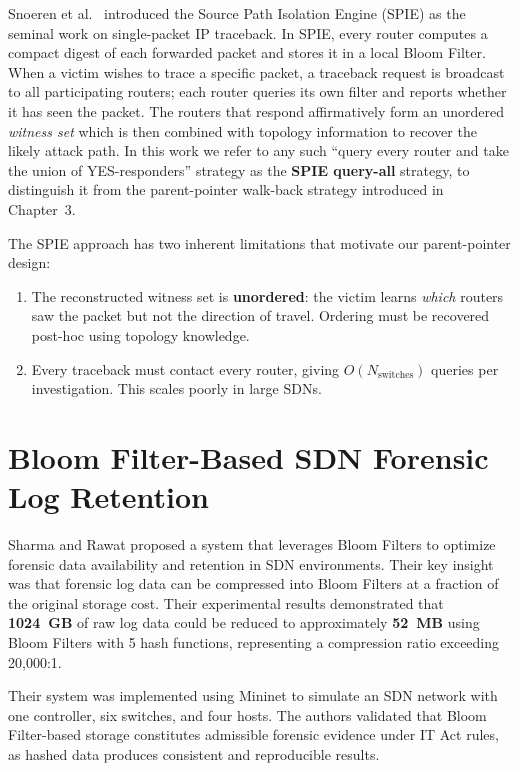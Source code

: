 \documentclass[12pt, a4paper]{report}
\begin{document}
Snoeren et al.\ \cite{snoeren2001spie} introduced the Source Path Isolation
Engine (SPIE) as the seminal work on single-packet IP traceback. In SPIE,
every router computes a compact digest of each forwarded packet and stores
it in a local Bloom Filter. When a victim wishes to trace a specific
packet, a traceback request is broadcast to all participating routers;
each router queries its own filter and reports whether it has seen the
packet. The routers that respond affirmatively form an unordered
\textit{witness set} which is then combined with topology information
to recover the likely attack path. In this work we refer to any such
``query every router and take the union of YES-responders'' strategy as
the \textbf{SPIE query-all} strategy, to distinguish it from the
parent-pointer walk-back strategy introduced in Chapter~3.

The SPIE approach has two inherent limitations that motivate our
parent-pointer design:

\begin{enumerate}[leftmargin=*]
  \item The reconstructed witness set is \textbf{unordered}: the victim
  learns \textit{which} routers saw the packet but not the direction of
  travel. Ordering must be recovered post-hoc using topology knowledge.
  \item Every traceback must contact every router, giving
  $O(N_{\text{switches}})$ queries per investigation. This scales poorly
  in large SDNs.
\end{enumerate}

\section{Bloom Filter-Based SDN Forensic Log Retention}

Sharma and Rawat \cite{sharma2023} proposed a system that leverages Bloom
Filters to optimize forensic data availability and retention in SDN
environments. Their key insight was that forensic log data can be compressed
into Bloom Filters at a fraction of the original storage cost. Their
experimental results demonstrated that \textbf{1024~GB} of raw log data
could be reduced to approximately \textbf{52~MB} using Bloom Filters with
5 hash functions, representing a compression ratio exceeding 20{,}000:1.

Their system was implemented using Mininet to simulate an SDN network with
one controller, six switches, and four hosts. The authors validated that
Bloom Filter-based storage constitutes admissible forensic evidence under
IT Act rules, as hashed data produces consistent and reproducible results.
\end{document}
